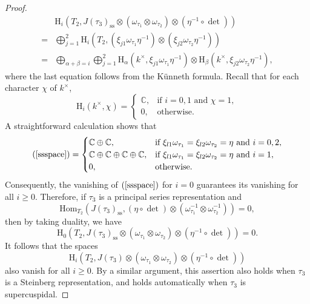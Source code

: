 \documentclass[12pt]{amsart}
\newcommand{\RH}{{\mathrm {H}}}
\newcommand{\Hom}{{\mathrm{Hom}}}
\theoremstyle{Theorem}
\theoremstyle{Theorem}
\theoremstyle{Theorem}
\theoremstyle{Theorem}
\theoremstyle{Plain}
\theoremstyle{remark}
\theoremstyle{remark}
\theoremstyle{Definition}
\begin{document}
\begin{proof}
\begin{equation}
        \label{ssspace}
        \begin{aligned}
             & \RH_i \left( T_2, J( \tau_3 )_\mathrm{ss} \otimes \left( \omega_{ \tau_1 } \otimes \omega_{ \tau_2 } \right) \otimes \left( \eta^{-1} \circ \det \right) \right)\\
            =& \bigoplus_{j = 1}^2 \RH_i \left( T_2, \left( \xi_{j1} \omega_{ \tau_1 } \eta^{-1} \right) \otimes \left( \xi_{j2} \omega_{ \tau_2 } \eta^{-1} \right) \right)   \\
            =& \bigoplus_{ \alpha + \beta = i } \bigoplus_{j = 1}^2 \RH_\alpha \left( k^\times, \xi_{j1} \omega_{ \tau_1 } \eta^{-1} \right) \otimes \RH_\beta \left( k^\times, \xi_{j2} \omega_{ \tau_2 } \eta^{-1} \right),
        \end{aligned}
    \end{equation}
    where the last equation follows from the K\"{u}nneth formula. Recall that for each character $\chi$ of $k^\times$,
    \[
        \RH_i ( k^\times, \chi ) =
        \begin{cases}
            \mathbb{C}, & \text{if } i = 0, 1 \text{ and } \chi = 1,\\
            0,          & \text{otherwise.}
        \end{cases}
    \]
    A straightforward calculation shows that
    \[
        ( \ref{ssspace} ) = 
        \begin{cases}
            \mathbb{C} \oplus \mathbb{C},                                     & \text{if } \xi_{l1} \omega_{ \tau_1 } = \xi_{l2} \omega_{ \tau_2 } = \eta \text{ and } i = 0, 2,                                                                                \\
            \mathbb{C} \oplus \mathbb{C} \oplus \mathbb{C} \oplus \mathbb{C}, & \text{if } \xi_{l1} \omega_{ \tau_1 } = \xi_{l2} \omega_{ \tau_2 } = \eta \text{ and } i = 1,\\
            0,                                                                & \text{otherwise.}
        \end{cases}
    \]
    Consequently, the vanishing of $ ( \ref{ssspace} ) $ for $ i = 0 $ guarantees its vanishing for all $ i \ge 0 $.
    Therefore, if $\tau_3$ is a principal series representation and 
    \[
        \Hom_{T_2}
        \left(
            J( \tau_3 )_\mathrm{ss},( \eta \circ \det ) \otimes \left( \omega_{ \tau_1 }^{-1} \otimes \omega_{ \tau_2 }^{-1} \right)
        \right)
        = 0,
    \]
    then by taking duality, we have
    \[
        \RH_0
        \left(
            T_2, J( \tau_3 )_\mathrm{ss} \otimes \left( \omega_{ \tau_1 } \otimes \omega_{ \tau_2 } \right) \otimes \left( \eta^{-1} \circ \det \right)
        \right)
        = 0.
    \]
    It follows that the spaces
    \[
        \RH_i
        \left(
            T_2, J( \tau_3 ) \otimes \left( \omega_{ \tau_1 } \otimes \omega_{ \tau_2 } \right) \otimes \left( \eta^{-1} \circ \det \right)
        \right)
    \]
    also vanish for all $ i \ge 0 $. By a similar argument, this assertion also holds when $\tau_3$ is a Steinberg representation, and holds automatically when $\tau_3$ is supercuspidal.
\end{proof}
\end{document}

